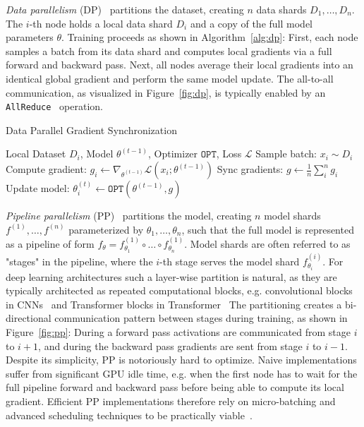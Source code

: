 \documentclass{article}
\begin{document}
\textit{Data parallelism} (DP)~\cite{dean2012dp} partitions the dataset,
creating $n$ data shards $D_1,\dots,D_n$. The $i$-th node holds a local data
shard $D_i$ and a copy of the full model parameters $\theta$. Training proceeds
as shown in Algorithm~\ref{alg:dp}: First, each node samples a batch from its
data shard and computes local gradients via a full forward and backward pass.
Next, all nodes average their local gradients into an identical global gradient
and perform the same model update. The all-to-all communication, as visualized
in Figure~\ref{fig:dp}, is typically enabled by an
\texttt{AllReduce}~\cite{walker1995mpi} operation.


\begin{algorithm}
\caption{Data Parallel Gradient Synchronization}
\label{alg:dp}
\begin{algorithmic}[1]
 Local Dataset $D_i$, Model $\theta^{(t-1)}$, Optimizer $\mathtt{OPT}$, Loss $\mathcal{L}$
\State Sample batch: $x_i\sim D_i$
\State Compute gradient: $g_i \gets \nabla_{\theta^{(t-1)}} \mathcal{L}(x_i; \theta^{(t-1)})$
\State Sync gradients: $g \gets \frac{1}{n}\sum_{i}^n g_i$ 
\State Update model: $\theta_i^{(t)} \gets \mathtt{OPT}(\theta^{(t-1)}, g)$
\end{algorithmic}
\end{algorithm}

\textit{Pipeline parallelism} (PP)~\cite{huang2019gpipe} partitions the model,
creating $n$ model shards $f^{(1)},\dots,f^{(n)}$ parameterized by
$\theta_1,\dots,\theta_n$, such that the full model is represented as a pipeline
of form $f_{\theta}=f^{(1)}_{\theta_1}\circ\dots\circ f^{(1)}_{\theta_n}$. Model
shards are often referred to as "stages" in the pipeline, where the $i$-th stage
serves the model shard $f^{(i)}_{\theta_i}$.  For deep learning architectures
such a layer-wise partition is natural, as they are typically architected as
repeated computational blocks, e.g. convolutional blocks in
CNNs~\cite{krizhevsky2012alexnet} and Transformer blocks in
Transformer~\cite{vaswani2017transformer} The partitioning creates a
bi-directional communication pattern between stages during training, as shown in
Figure~\ref{fig:pp}: During a forward pass activations are communicated from
stage $i$ to $i+1$, and during the backward pass gradients are sent from stage
$i$ to $i-1$. Despite its simplicity, PP is notoriously hard to optimize. Naive
implementations suffer from significant GPU idle time, e.g. when the first node
has to wait for the full pipeline forward and backward pass before being able to
compute its local gradient. Efficient PP implementations therefore rely on
micro-batching and advanced scheduling techniques to be practically
viable~\cite{harlap2018pipedream, huang2019gpipe}. 
\end{document}
